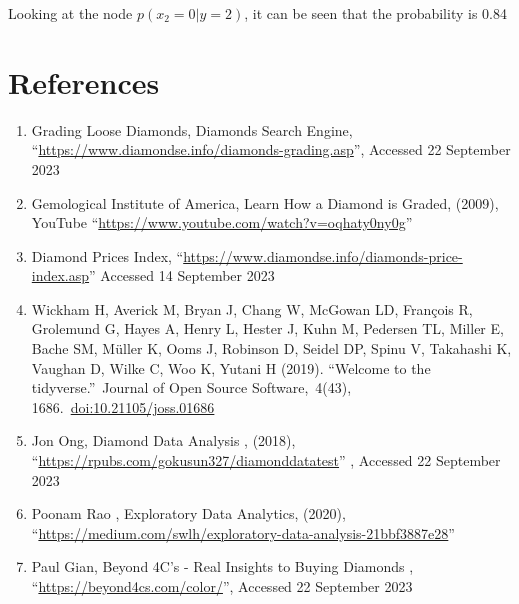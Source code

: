 \documentclass[
]{article}
\begin{document}
Looking at the node \(p(x_2=0|y=2)\), it can be seen that the
probability is 0.84

\newpage

\section{References}\label{references}

\begin{enumerate}
\def\labelenumi{\arabic{enumi})}
\item
  Grading Loose Diamonds, Diamonds Search Engine,
  ``\url{https://www.diamondse.info/diamonds-grading.asp}'', Accessed 22
  September 2023
\item
  Gemological Institute of America, Learn How a Diamond is Graded,
  (2009), YouTube ``\url{https://www.youtube.com/watch?v=oqhaty0ny0g}''
\item
  Diamond Prices Index,
  ``\url{https://www.diamondse.info/diamonds-price-index.asp}'' Accessed
  14 September 2023
\item
  Wickham H, Averick M, Bryan J, Chang W, McGowan LD, François R,
  Grolemund G, Hayes A, Henry L, Hester J, Kuhn M, Pedersen TL, Miller
  E, Bache SM, Müller K, Ooms J, Robinson D, Seidel DP, Spinu V,
  Takahashi K, Vaughan D, Wilke C, Woo K, Yutani H (2019). ``Welcome to
  the tidyverse.''~Journal of Open Source Software,~4(43),
  1686.~\url{doi:10.21105/joss.01686}
\item
  Jon Ong, Diamond Data Analysis , (2018),
  ``\url{https://rpubs.com/gokusun327/diamonddatatest}'' , Accessed 22
  September 2023
\item
  Poonam Rao , Exploratory Data Analytics, (2020),
  ``\url{https://medium.com/swlh/exploratory-data-analysis-21bbf3887e28}''
\item
  Paul Gian, Beyond 4C's - Real Insights to Buying Diamonds ,
  ``\url{https://beyond4cs.com/color/}'', Accessed 22 September 2023
\end{enumerate}
\end{document}

